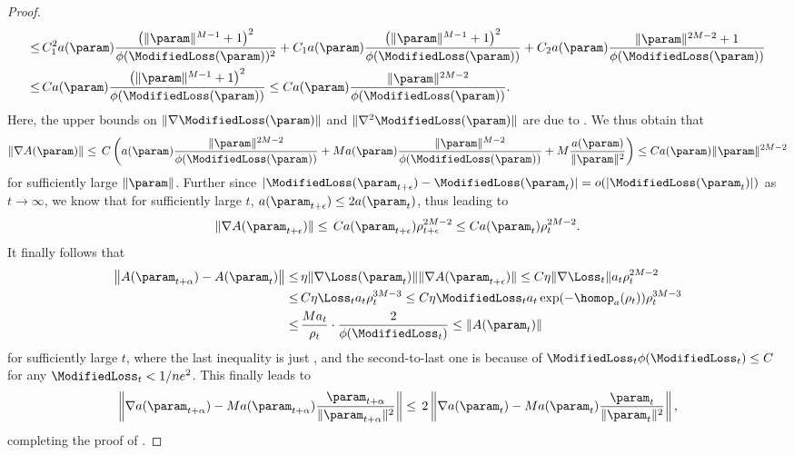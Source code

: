 \begin{proof}
\begin{align*}
        \le \, & C_1^2 a(\param) \frac{\left( \| \param \|^{M-1} + 1 \right)^2}{\phi(\ModifiedLoss(\param))^2} + C_1 a(\param) \frac{\left( \| \param \|^{M-1} + 1 \right)^2}{\phi(\ModifiedLoss(\param))} + C_2 a(\param) \frac{\| \param \|^{2M-2} + 1}{\phi(\ModifiedLoss(\param))} \\
        \le \, & C a(\param) \frac{\left( \| \param \|^{M-1} + 1 \right)^2}{\phi(\ModifiedLoss(\param))} \le C a(\param) \frac{\| \param \|^{2M - 2} }{\phi(\ModifiedLoss(\param))}.
    \end{align*}
    Here, the upper bounds on $\| \nabla \ModifiedLoss(\param) \|$ and $\| \nabla^2 \ModifiedLoss(\param) \|$ are due to . We thus obtain that
    \begin{align*}
        \| \nabla A(\param) \| \le \, C \left( a(\param) \frac{ \| \param \|^{2 M - 2}}{\phi(\ModifiedLoss(\param))} + M a(\param) \frac{ \| \param \|^{M - 2}}{\phi(\ModifiedLoss(\param))} + M \frac{a(\param)}{\| \param \|^2} \right) \le C a(\param) \| \param \|^{2 M - 2}
    \end{align*}
    for sufficiently large $\| \param \|$.
    Further since $\vert \ModifiedLoss (\param_{t+\epsilon} ) - \ModifiedLoss (\param_t) \vert = o (\vert \ModifiedLoss (\param_t) \vert)$ as $t \to \infty$, we know that for sufficiently large $t$, $a(\param_{t+\epsilon}) \le 2 a(\param_t)$,
    thus leading to
    \begin{equation*}
        \| \nabla A(\param_{t+\epsilon}) \| \le \, C a(\param_{t+\epsilon}) \rho_{t+\epsilon}^{2M - 2} \le C a(\param_t) \rho_t^{2M - 2}.
    \end{equation*}
    It finally follows that
    \begin{align*}
        \left\Vert A(\param_{t+\alpha}) - A(\param_t) \right\Vert \le \, & \eta \| \nabla \Loss (\param_t) \| \| \nabla A(\param_{t+\epsilon}) \| \le C \eta \| \nabla \Loss_t \| a_t \rho_t^{2M - 2} \\
        \le \, & C \eta \Loss_t a_t \rho_t^{3M - 3} \le C \eta \ModifiedLoss_t a_t \exp(- \homop_a(\rho_t)) \rho_t^{3M - 3} \\
        \le \, & \frac{M a_t}{\rho_t} \cdot \frac{2}{\phi(\ModifiedLoss_t)} \le \Vert A(\param_t) \Vert
    \end{align*}
    for sufficiently large $t$,
    where the last inequality is just , and the second-to-last one is because of $\ModifiedLoss_t \phi(\ModifiedLoss_t) \le C$ for any $\ModifiedLoss_t < 1 / ne^2$.
    This finally leads to
    \begin{equation*}
        \left\| \nabla a(\param_{t+\alpha}) - M a(\param_{t+\alpha}) \frac{\param_{t+\alpha}}{\| \param_{t+\alpha} \|^2} \right\| \le \, 2 \left\| \nabla a(\param_t) - M a(\param_t) \frac{\param_t}{\| \param_t \|^2} \right\|,
    \end{equation*}
    completing the proof of .
\end{proof}


